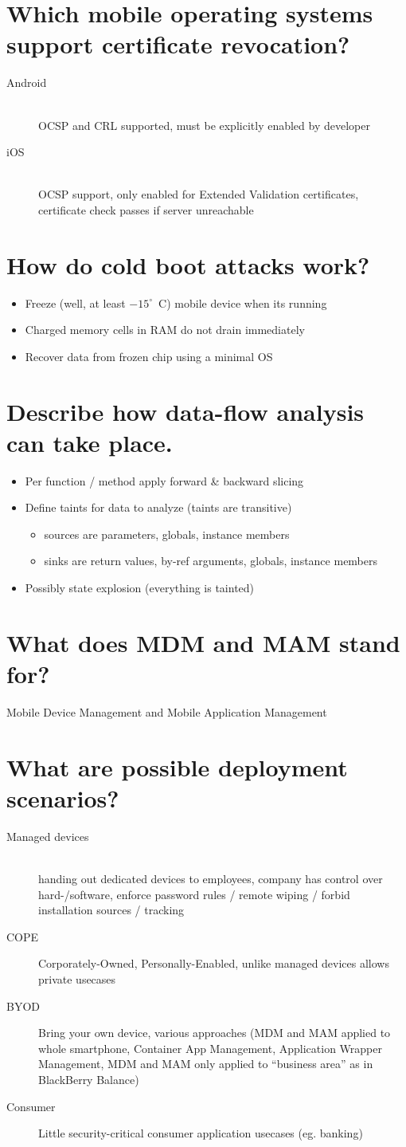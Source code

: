 \documentclass[twocolumn]{article}
\newcommand{\question}[1]{\section{#1}}
\begin{document}
\question{Which mobile operating systems support certificate revocation?}
%
\begin{description}
  \item[Android]\hfill{}\\ OCSP and CRL supported, must be explicitly enabled by developer
  \item[iOS]\hfill{}\\ OCSP support, only enabled for Extended Validation certificates, certificate check passes if server unreachable
\end{description}

\question{How do cold boot attacks work?}
%
\begin{itemize}
  \item Freeze (well, at least $-15^\circ$~C) mobile device when its running
  \item Charged memory cells in RAM do not drain immediately
  \item Recover data from frozen chip using a minimal OS
\end{itemize}

\question{Describe how data-flow analysis can take place.}
%
\begin{itemize}
  \item Per function / method apply forward \& backward slicing
  \item Define taints for data to analyze (taints are transitive)
    \begin{itemize}
      \item sources are parameters, globals, instance members
      \item sinks are return values, by-ref arguments, globals, instance members
    \end{itemize}
  \item Possibly state explosion (everything is tainted)
\end{itemize}

\question{What does MDM and MAM stand for?}
%
Mobile Device Management and Mobile Application Management

\question{What are possible deployment scenarios?}
%
\begin{description}
  \item[Managed devices]\hfill{}\\ handing out dedicated devices to employees, company has control over hard-/software, enforce password rules / remote wiping / forbid installation sources / tracking
  \item[COPE] Corporately-Owned, Personally-Enabled, unlike managed devices allows private usecases
  \item[BYOD] Bring your own device, various approaches (MDM and MAM applied to whole smartphone, Container App Management, Application Wrapper Management, MDM and MAM only applied to ``business area'' as in BlackBerry Balance)
  \item[Consumer] Little security-critical consumer application usecases (eg. banking)
\end{description}
\end{document}
